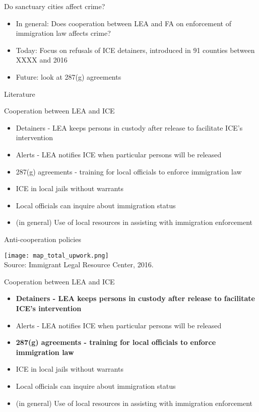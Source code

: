 \documentclass[xcolor=pdftex,dvipsnames,table]{beamer}
\begin{document}
\begin{frame}{ Do sanctuary cities affect crime?}
\begin{itemize}
\item In general: Does cooperation between LEA and FA on enforcement of immigration law affects crime?
\item Today: Focus on refusals of ICE detainers, introduced in 91 counties between XXXX and 2016
\item Future: look at 287(g) agreements
\end{itemize}
\end{frame}

\begin{frame}{Literature}
\end{frame}

\begin{frame}{Cooperation between LEA and ICE}
\begin{itemize}
\item Detainers - LEA keeps persons in custody after release to facilitate ICE's intervention
\item Alerts - LEA notifies ICE when particular persons will be released
\item 287(g) agreements - training for local officials to enforce immigration law
\item ICE in local jails without warrants
\item Local officials can inquire about immigration status
\item (in general) Use of local resources in assisting with immigration enforcement
\end{itemize}
\end{frame}

\begin{frame}{Anti-cooperation policies}
\begin{center}
\texttt{[image: map\_total\_upwork.png]}
\\\tiny{Source: Immigrant Legal Resource Center, 2016.}
\end{center}
\end{frame}

\begin{frame}{Cooperation between LEA and ICE}
\begin{itemize}
\item \textbf{Detainers - LEA keeps persons in custody after release to facilitate ICE's intervention}
\item Alerts - LEA notifies ICE when particular persons will be released
\item \textbf{287(g) agreements - training for local officials to enforce immigration law}
\item ICE in local jails without warrants
\item Local officials can inquire about immigration status
\item (in general)  Use of local resources in assisting with immigration enforcement
\end{itemize}
\end{frame}
\end{document}
